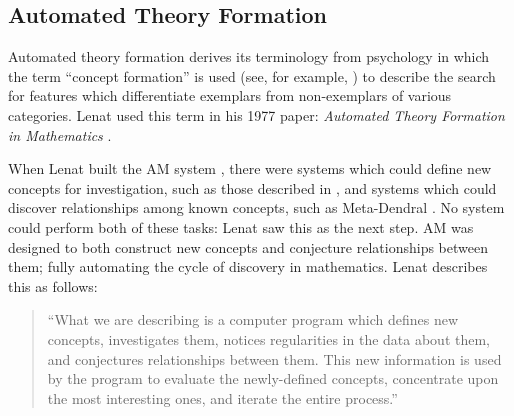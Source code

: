 \subsection{Automated Theory Formation}

Automated theory formation derives its terminology from psychology in which the
term ``concept formation'' is used (see, for example, \cite{bruner:67}) to
describe the search for features which differentiate exemplars from
non-exemplars of various categories. Lenat used this term in his 1977 paper:
{\em Automated Theory Formation in Mathematics} \cite{lenat:77}.

When Lenat built the AM system \cite{lenat:77}, there were systems
which could define new concepts for investigation, such as those
described in \cite{winston}, and systems which could discover
relationships among known concepts, such as Meta-Dendral
\cite{buchanan:75}. No system could perform both of these tasks: Lenat
saw this as the next step. AM was designed to both construct new
concepts and conjecture relationships between them; fully automating
the cycle of discovery in mathematics. Lenat describes this as
follows:

\begin{quote}
``What we are describing is a computer program which
defines new concepts, investigates them, notices
regularities in the data about them, and conjectures
relationships between them. This new information is used
by the program to evaluate the newly-defined concepts,
concentrate upon the most interesting ones, and iterate the
entire process.'' \cite[p. 834]{lenat:77}
\end{quote}

